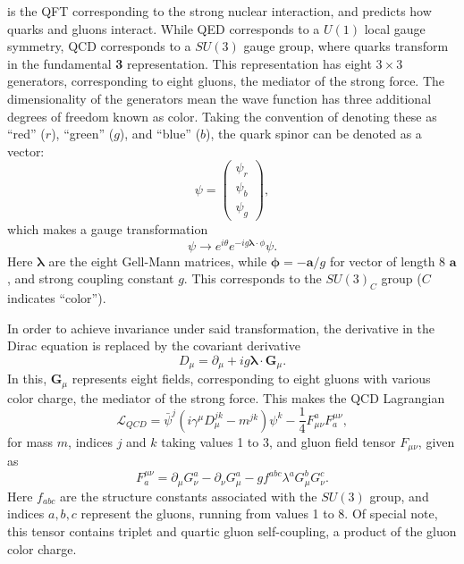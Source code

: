          is the \gls{QFT} corresponding to the strong nuclear interaction, and predicts how quarks and gluons interact. While \gls{QED} corresponds to a $U(1)$ local gauge symmetry, \gls{QCD} corresponds to a $SU(3)$ gauge group, where quarks transform in the fundamental {\bf 3} representation. This representation has eight $3 \times 3$ generators, corresponding to eight gluons, the mediator of the strong force. The dimensionality of the generators mean the wave function has three additional degrees of freedom known as color. Taking the convention of denoting these as ``red'' ($r$), ``green'' ($g$), and ``blue'' ($b$), the quark spinor can be denoted as a vector:
        \begin{equation}
            \psi =\begin{pmatrix} \psi_{r} \\ \psi_{b} \\ \psi_{g}\end{pmatrix},
        \end{equation}
        which makes a gauge transformation
        \begin{equation}
        \psi \rightarrow e^{i\theta}e^{-ig {\boldsymbol \lambda\cdot \phi}}\psi.
        \end{equation}
        Here $\boldsymbol \lambda$ are the eight Gell-Mann matrices, while ${\boldsymbol \phi} = -{\boldsymbol a}/g$ for vector of length 8 $\boldsymbol a$, and strong coupling constant $g$. This corresponds to the $SU(3)_C$ group ($C$ indicates ``color'').

        In order to achieve invariance under said transformation, the derivative in the Dirac equation is replaced by the covariant derivative 
        \begin{equation}
            D_{\mu} = \partial_{\mu} + ig {\boldsymbol \lambda\cdot {\boldsymbol G_{\mu}}}.
        \end{equation}
        In this, ${\boldsymbol G_{\mu}}$ represents eight fields, corresponding to eight gluons with various color charge, the mediator of the strong force. This makes the \gls{QCD} Lagrangian
        \begin{equation}
            \mathcal{L}_{QCD} = \bar{\psi}^j (i \gamma^{\mu} D_{\mu}^{jk} - m^{jk})\psi^{k} - \frac{1}{4} F_{\mu \nu}^{a} F^{\mu \nu}_{a},
        \end{equation}
        for mass $m$, indices $j$ and $k$ taking values 1 to 3, and gluon field tensor $F_{\mu \nu}$, given as
        \begin{equation}
            F^{\mu \nu}_{a} = \partial_{\mu} G_{\nu}^a - \partial_{\nu}G_{\mu}^a - g f^{abc} \lambda^a G_{\mu}^b G_{\nu}^c.
        \end{equation}
        Here $f_{abc}$ are the structure constants associated with the $SU(3)$ group, and indices $a,b,c$ represent the gluons, running from values 1 to 8. Of special note, this tensor contains triplet and quartic gluon self-coupling, a product of the gluon color charge.


